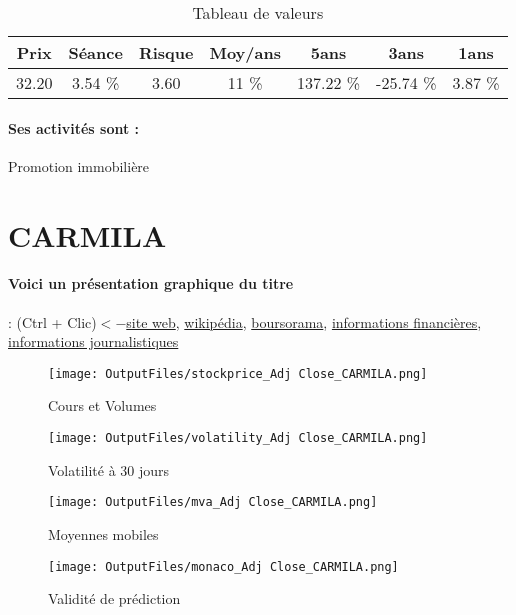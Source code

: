 \documentclass[11pt,a4paper]{report}%
\begin{document}
\begin{table}[H]
  \centering
    \begin{tabular}{|c|c|c|c|c|c|c|}
    \hline
    Prix & Séance & Risque  & Moy/ans & 5ans & 3ans & 1ans \\
    \hline
    32.20 &    3.54 \%    & 3.60 & 11 \% & 137.22 \% & -25.74 \% & 3.87 \% \\
    \hline
    \end{tabular}%
        \label{tab:table_CAPELLI}%
      \caption{Tableau de valeurs}
\end{table}%

\paragraph{Ses activités sont : } Promotion immobilière 
    
    \newpage

\section{CARMILA}

\paragraph{Voici un présentation graphique du titre} : (Ctrl + Clic)$<-$\href{https://www.carmila.com/finance/}{site web}, \href{https://fr.wikipedia.org/wiki/Carmila}{wikipédia}, \href{https://www.boursorama.com/cours/1rPCARM}{boursorama}, \href{https://www.qwant.com/?q=site:https:%2f%2fwww.easybourse.com%2faction-societe%2fCARMILA&t=web&client=ext-firefox-hp}{informations financières}, \href{https://bourse.lerevenu.com/cours-de-bourse/fiche-valeur-synthese/CARMILA/CARM-FR}{informations journalistiques}
\begin{figure}[!htb]
   \begin{minipage}{0.5\textwidth}
     \centering
     \texttt{[image: OutputFiles/stockprice\_Adj Close\_CARMILA.png]}
     \caption{Cours et Volumes}\label{Fig:price_CARMILA}
   \end{minipage}\hfill
   \begin{minipage}{0.5\textwidth}
     \centering
     \texttt{[image: OutputFiles/volatility\_Adj Close\_CARMILA.png]}
     \caption{Volatilité à 30 jours}\label{Fig:volat_CARMILA}
   \end{minipage}
\end{figure}
\begin{figure}[!htb]
   \begin{minipage}{0.5\textwidth}
     \centering
     \texttt{[image: OutputFiles/mva\_Adj Close\_CARMILA.png]}
     \caption{Moyennes mobiles}\label{Fig:mva_CARMILA}
   \end{minipage}\hfill
   \begin{minipage}{0.5\textwidth}
     \centering
     \texttt{[image: OutputFiles/monaco\_Adj Close\_CARMILA.png]}
     \caption{Validité de prédiction}\label{Fig:prediction_CARMILA}
   \end{minipage}
\end{figure}
\end{document}

